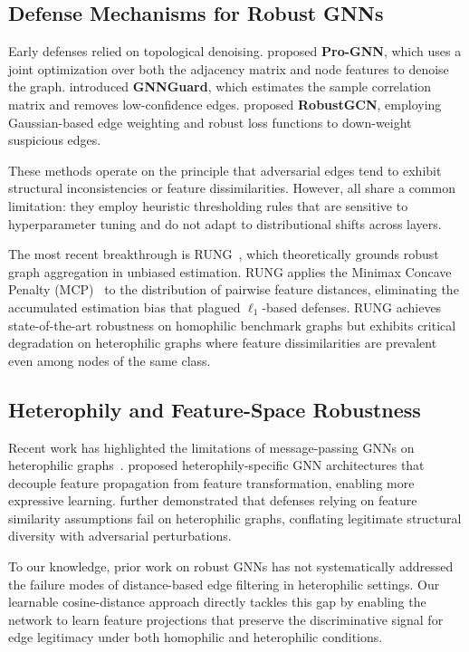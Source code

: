 \documentclass[sigconf]{acmart}
\begin{document}
\subsection{Defense Mechanisms for Robust GNNs}

Early defenses relied on topological denoising. \citet{tam2021defending} proposed \textbf{Pro-GNN}, which uses a joint optimization over both the adjacency matrix and node features to denoise the graph. \citet{zhu2020graph} introduced \textbf{GNNGuard}, which estimates the sample correlation matrix and removes low-confidence edges. \citet{li2020towards} proposed \textbf{RobustGCN}, employing Gaussian-based edge weighting and robust loss functions to down-weight suspicious edges.

These methods operate on the principle that adversarial edges tend to exhibit structural inconsistencies or feature dissimilarities. However, all share a common limitation: they employ heuristic thresholding rules that are sensitive to hyperparameter tuning and do not adapt to distributional shifts across layers.

The most recent breakthrough is RUNG~\cite{hou2024rung}, which theoretically grounds robust graph aggregation in unbiased estimation. RUNG applies the Minimax Concave Penalty (MCP)~\cite{zhang2010mcp} to the distribution of pairwise feature distances, eliminating the accumulated estimation bias that plagued $\ell_1$-based defenses. RUNG achieves state-of-the-art robustness on homophilic benchmark graphs but exhibits critical degradation on heterophilic graphs where feature dissimilarities are prevalent even among nodes of the same class.

\subsection{Heterophily and Feature-Space Robustness}

Recent work has highlighted the limitations of message-passing GNNs on heterophilic graphs~\cite{zhu2020beyond}. \citet{luan2022towards} proposed heterophily-specific GNN architectures that decouple feature propagation from feature transformation, enabling more expressive learning. \citet{yan2021heterophilic} further demonstrated that defenses relying on feature similarity assumptions fail on heterophilic graphs, conflating legitimate structural diversity with adversarial perturbations.

To our knowledge, prior work on robust GNNs has not systematically addressed the failure modes of distance-based edge filtering in heterophilic settings. Our learnable cosine-distance approach directly tackles this gap by enabling the network to learn feature projections that preserve the discriminative signal for edge legitimacy under both homophilic and heterophilic conditions.
\end{document}
